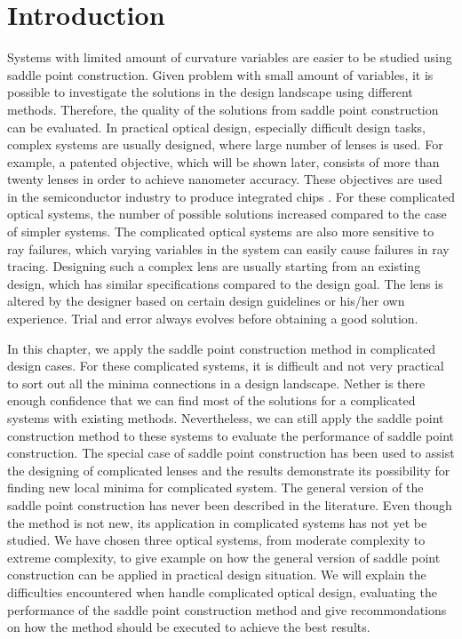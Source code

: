 \section{Introduction}

Systems with limited amount of curvature variables are easier to be studied using saddle point construction. Given problem with small amount of variables, it is possible to investigate the solutions in the design landscape using different methods. Therefore, the quality of the solutions from saddle point construction can be evaluated. In practical optical design, especially difficult design tasks, complex systems are usually designed, where large number of lenses is used. For example, a patented objective, which will be shown later, consists of more than twenty lenses in order to achieve nanometer accuracy. These objectives are used in the semiconductor industry to produce integrated chips \cite{Matsuyama2006_LithoHis}. For these complicated optical systems, the number of possible solutions increased compared to the case of simpler systems. The complicated optical systems are also more sensitive to ray failures, which varying variables in the system can easily cause failures in ray tracing. Designing such a complex lens are usually starting from an existing design, which has similar specifications compared to the design goal. The lens is altered by the designer based on certain design guidelines \cite{LivshitsQA2013}\cite{Shafer1995_moreless}\cite{Cao2017_GroupDesign} or his/her own experience. Trial and error always evolves before obtaining a good solution. 

In this chapter, we apply the saddle point construction method in complicated design cases. For these complicated systems, it is difficult and not very practical to sort out all the minima connections in a design landscape. Nether is there enough confidence that we can find most of the solutions for a complicated systems with existing methods. Nevertheless, we can still apply the saddle point construction method to these systems to evaluate the performance of saddle point construction. The special case of saddle point construction has been used to assist the designing of complicated lenses \cite{Cao2017_GroupDesign}\cite{MarinescuSP2008}\cite{MarinescuSPS2008_p2} and the results demonstrate its possibility for finding new local minima for complicated system. The general version of the saddle point construction \cite{vanTurnhoutThesis2009} has never been described in the literature. Even though the method is not new, its application in complicated systems has not yet be studied. We have chosen three optical systems, from moderate complexity to extreme complexity, to give example on how the general version of saddle point construction can be applied in practical design situation. We will explain the difficulties encountered when handle complicated optical design, evaluating the performance of the saddle point construction method and give recommondations on how the method should be executed to achieve the best results.


